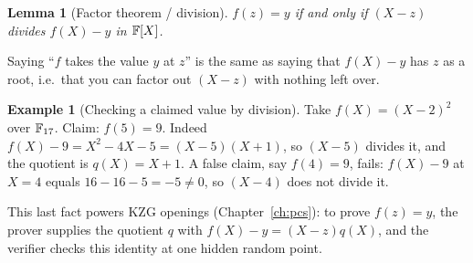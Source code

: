 \documentclass[11pt,a4paper]{report}
\theoremstyle{plain}
\newtheorem{lemma}[theorem]{Lemma}
\theoremstyle{definition}
\newtheorem{example}[theorem]{Example}
\theoremstyle{remark}
\begin{document}
\begin{lemma}[Factor theorem / division]\label{lem:factor}
$f(z)=y$ if and only if $(X-z)$ divides $f(X)-y$ in $\mathbb{F}[X]$.
\end{lemma}
\begin{plain}\PE
Saying ``$f$ takes the value $y$ at $z$'' is the same as saying that $f(X)-y$ has $z$ as a root, i.e.\ that you can factor out $(X-z)$ with nothing left over.
\end{plain}
\begin{example}[Checking a claimed value by division]
Take $f(X)=(X-2)^2$ over $\mathbb{F}_{17}$. Claim: $f(5)=9$. Indeed $f(X)-9=X^2-4X-5=(X-5)(X+1)$, so $(X-5)$ divides it, and the quotient is $q(X)=X+1$. A false claim, say $f(4)=9$, fails: $f(X)-9$ at $X=4$ equals $16-16-5=-5\neq0$, so $(X-4)$ does not divide it.
\end{example}
This last fact powers KZG openings (Chapter~\ref{ch:pcs}): to prove $f(z)=y$, the prover supplies the quotient $q$ with $f(X)-y=(X-z)q(X)$, and the verifier checks this identity at one hidden random point.

\end{document}
